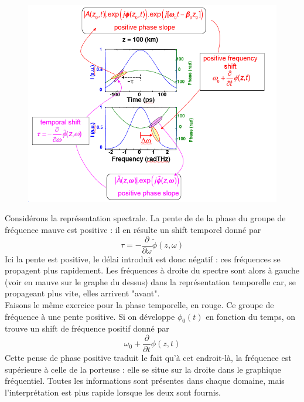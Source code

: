 	\begin{figure}
	\includegraphics[scale=0.5]{ch1/image34}
	\end{figure}
	Considérons la représentation spectrale. La pente de de la phase du groupe de fréquence mauve
	est positive : il en résulte un shift temporel donné par
	\begin{equation}
	\tau  =  - \frac{\partial }{{\partial \omega }}\tilde \phi (z,\omega )
	\end{equation}
	Ici la pente est positive, le délai introduit est donc négatif : ces fréquences se propagent plus
	rapidement. Les fréquences à droite du spectre sont alors à gauche (voir en mauve sur le graphe
	du dessus) dans la représentation temporelle car, se propageant plus vite, elles arrivent 
	"avant". \\
	
	Faisons le même exercice pour la phase temporelle, en rouge. Ce groupe de fréquence à une pente 
	positive. Si on développe $\phi_0(t)$ en fonction du temps, on trouve un shift de fréquence 
	positif donné par 
	\begin{equation}
	{\omega _0} + \frac{\partial }{{\partial t}}\phi (z,t)
	\end{equation}
	Cette pense de phase positive traduit le fait qu'à cet endroit-là, la fréquence est supérieure à
	celle de la porteuse : elle se situe sur la droite dans le graphique fréquentiel. Toutes les
	informations sont présentes dans chaque domaine, mais l'interprétation est plus rapide lorsque
	les deux sont fournis.\\
	
